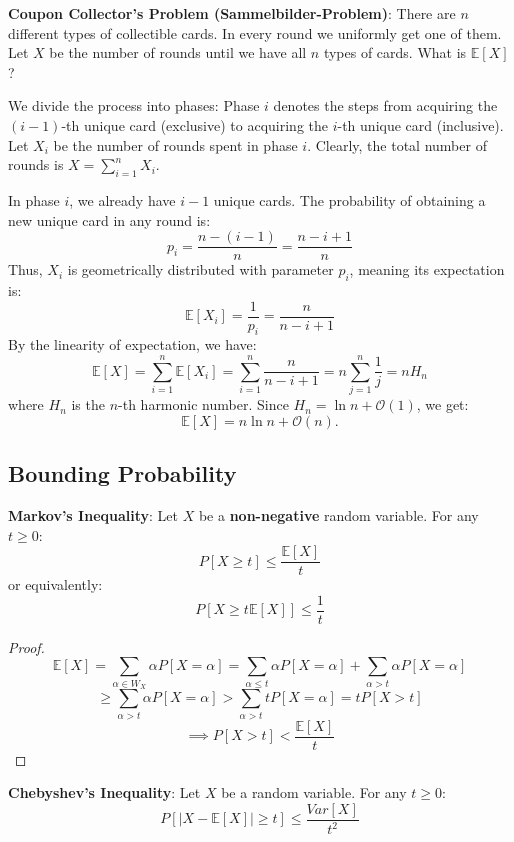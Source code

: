 \begin{example}
	\textbf{Coupon Collector's Problem (Sammelbilder-Problem)}:
	There are $n$ different types of collectible cards. In every round we uniformly get one of them. Let $X$ be the number of rounds until we have all $n$ types of cards. What is $\mathbb{E}[X]$?

	We divide the process into phases: Phase $i$ denotes the steps from acquiring the $(i-1)$-th unique card (exclusive) to acquiring the $i$-th unique card (inclusive). Let $X_i$ be the number of rounds spent in phase $i$. Clearly, the total number of rounds is $X = \sum_{i=1}^n X_i$.

	In phase $i$, we already have $i-1$ unique cards. The probability of obtaining a new unique card in any round is:
	$$p_i = \frac{n - (i - 1)}{n} = \frac{n - i + 1}{n}$$
	Thus, $X_i$ is geometrically distributed with parameter $p_i$, meaning its expectation is:
	$$\mathbb{E}[X_i] = \frac{1}{p_i} = \frac{n}{n - i + 1}$$
	By the linearity of expectation, we have:
	$$\mathbb{E}[X] = \sum_{i=1}^n \mathbb{E}[X_i] = \sum_{i=1}^n \frac{n}{n - i + 1} = n \sum_{j=1}^n \frac{1}{j} = n H_n$$
	where $H_n$ is the $n$-th harmonic number. Since $H_n = \ln n + \mathcal{O}(1)$, we get:
	$$\mathbb{E}[X] = n \ln n + \mathcal{O}(n).$$
\end{example}

\subsection{Bounding Probability}

\begin{theorem}
	\textbf{Markov's Inequality}: Let $X$ be a \textbf{non-negative} random variable. For any $t \geq 0$:
	$$P[X \geq t] \leq \frac{\mathbb{E}[X]}{t}$$
	or equivalently:
	$$P[X \geq t \mathbb{E}[X]] \leq \frac{1}{t}$$
\end{theorem}

\begin{proof}
	$$\mathbb{E}[X] = \sum_{\alpha \in W_X} \alpha P[X=\alpha] = \sum_{\alpha \le t} \alpha P[X=\alpha] + \sum_{\alpha > t} \alpha P[X=\alpha]$$
	$$\geq \sum_{\alpha > t} \alpha P[X=\alpha] > \sum_{\alpha > t} t P[X=\alpha] = t P[X > t]$$
	$$\implies P[X > t] < \frac{\mathbb{E}[X]}{t}$$
\end{proof}

\begin{theorem}
	\textbf{Chebyshev's Inequality}: Let $X$ be a random variable. For any $t \geq 0$:
	$$P[|X-\mathbb{E}[X]| \geq t] \leq \frac{Var[X]}{t^2}$$
\end{theorem}

